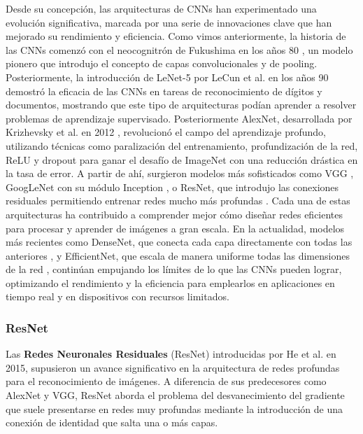 Desde su concepción, las arquitecturas de CNNs han experimentado una evolución significativa, marcada por una serie de innovaciones clave que han mejorado su rendimiento y eficiencia. Como vimos anteriormente, la historia de las CNNs comenzó con el neocognitrón de Fukushima en los años 80 \cite{fukushima1980neocognitron}, un modelo pionero que introdujo el concepto de capas convolucionales y de pooling. Posteriormente, la introducción de LeNet-5 por LeCun et al. en los años 90 \cite{lecun1998gradient} demostró la eficacia de las CNNs en tareas de reconocimiento de dígitos y documentos, mostrando que este tipo de arquitecturas podían aprender a resolver problemas de aprendizaje supervisado. Posteriormente AlexNet, desarrollada por Krizhevsky et al. en 2012 \cite{krizhevsky2012imagenet}, revolucionó el campo del aprendizaje profundo, utilizando técnicas como paralización del entrenamiento, profundización de la red, ReLU y dropout para ganar el desafío de ImageNet con una reducción drástica en la tasa de error. A partir de ahí, surgieron modelos más sofisticados como VGG \cite{simonyan2014very}, GoogLeNet con su módulo Inception \cite{szegedy2015going}, o ResNet, que introdujo las conexiones residuales permitiendo entrenar redes mucho más profundas \cite{he2016deep}. Cada una de estas arquitecturas ha contribuido a comprender mejor cómo diseñar redes eficientes para procesar y aprender de imágenes a gran escala. En la actualidad, modelos más recientes como DenseNet, que conecta cada capa directamente con todas las anteriores \cite{huang2017densely}, y EfficientNet, que escala de manera uniforme todas las dimensiones de la red \cite{tan2019efficientnet}, continúan empujando los límites de lo que las CNNs pueden lograr, optimizando el rendimiento y la eficiencia para emplearlos en aplicaciones en tiempo real y en dispositivos con recursos limitados.

\subsubsection{ResNet}

Las \textbf{Redes Neuronales Residuales} (ResNet) introducidas por He et al. en 2015, supusieron un avance significativo en la arquitectura de redes profundas para el reconocimiento de imágenes. A diferencia de sus predecesores como AlexNet y VGG, ResNet aborda el problema del desvanecimiento del gradiente que suele presentarse en redes muy profundas mediante la introducción de una conexión de identidad que salta una o más capas.


